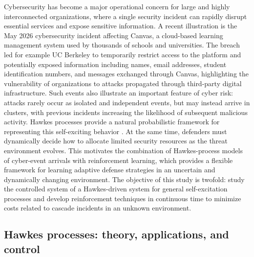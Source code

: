 \documentclass[11pt]{article}
\theoremstyle{remarkitalic}
\theoremstyle{remarkitalic}
\newcommand{\1}{\mathbf 1}
\begin{document}
Cybersecurity has become a major operational concern for large and highly interconnected organizations, where a single security incident can rapidly disrupt essential services and expose sensitive information. A recent illustration is the May 2026 cybersecurity incident affecting Canvas, a cloud-based learning management system used by thousands of schools and universities. The breach led for example UC Berkeley to temporarily restrict access to the platform and potentially exposed information including names, email addresses, student identification numbers, and messages exchanged through Canvas, highlighting the vulnerability of organizations to attacks propagated through third-party digital infrastructure. Such events also illustrate an important feature of cyber risk: attacks rarely occur as isolated and independent events, but may instead arrive in clusters, with previous incidents increasing the likelihood of subsequent malicious activity. Hawkes processes provide a natural probabilistic framework for representing this self-exciting behavior \cite{baldwin2017contagion}. At the same time, defenders must dynamically decide how to allocate limited security resources as the threat environment evolves. This motivates the combination of Hawkes-process models of cyber-event arrivals with reinforcement learning, which provides a flexible framework for learning adaptive defense strategies in an uncertain and dynamically changing environment. The objective of this study is twofold: study the controlled system of a Hawkes-driven system for general self-excitation processes and develop reinforcement techniques in continuous time to minimize costs related to cascade incidents in an unknown environment.  
\subsection{Hawkes processes: theory, applications, and control}
\end{document}
